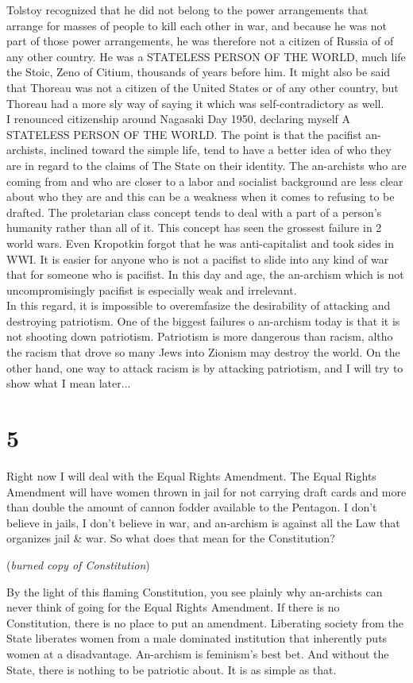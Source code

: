 Tolstoy recognized that he did not belong to the power arrangements that arrange for masses of people to kill each other in war, and because he was not part of those power arrangements, he was therefore not a citizen of Russia of of any other country. He was a STATELESS PERSON OF THE WORLD, much life the Stoic, Zeno of Citium, thousands of years before him. It might also be said that Thoreau was not a citizen of the United States or of any other country, but Thoreau had a more sly way of saying it which was self-contradictory as well.\\
I renounced citizenship around Nagasaki Day 1950, declaring myself A STATELESS PERSON OF THE WORLD. The point is that the pacifist an-archists, inclined toward the simple life, tend to have a better idea of who they are in regard to the claims of The State on their identity. The an-archists who are coming from and who are closer to a labor and socialist background are less clear about who they are and this can be a weakness when it comes to refusing to be drafted. The proletarian class concept tends to deal with a part of a person's humanity rather than all of it. This concept has seen the grossest failure in 2 world wars. Even Kropotkin forgot that he was anti-capitalist and took sides in WWI. It is easier for anyone who is not a pacifist to slide into any kind of war that for someone who is pacifist. In this day and age, the an-archism which is not uncompromisingly pacifist is especially weak and irrelevant.\\
In this regard, it is impossible to overemfasize the desirability of attacking and destroying patriotism. One of the biggest failures o an-archism today is that it is not shooting down patriotism. Patriotism is more dangerous than racism, altho the racism that drove so many Jews into Zionism may destroy the world. On the other hand, one way to attack racism is by attacking patriotism, and I will try to show what I mean later...

\section*{5}
Right now I will deal with the Equal Rights Amendment. The Equal Rights Amendment will have women thrown in jail for not carrying draft cards and more than double the amount of cannon fodder available to the Pentagon. I don't believe in jails, I don't believe in war, and an-archism is against all the Law that organizes jail \& war. So what does that mean for the Constitution?
\begin{center}
(\emph{burned copy of Constitution})
\end{center}
By the light of this flaming Constitution, you see plainly why an-archists can never think of going for the Equal Rights Amendment. If there is no Constitution, there is no place to put an amendment. Liberating society from the State liberates women from a male dominated institution that inherently puts women at a disadvantage. An-archism is feminism's best bet. And without the State, there is nothing to be patriotic about. It is as simple as that.

